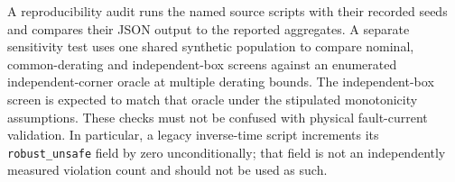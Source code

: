 A reproducibility audit runs the named source scripts with their recorded seeds and compares their JSON output to the reported aggregates. A separate sensitivity test uses one shared synthetic population to compare nominal, common-derating and independent-box screens against an enumerated independent-corner oracle at multiple derating bounds. The independent-box screen is expected to match that oracle under the stipulated monotonicity assumptions. These checks must not be confused with physical fault-current validation. In particular, a legacy inverse-time script increments its \texttt{robust\_unsafe} field by zero unconditionally; that field is not an independently measured violation count and should not be used as such.
